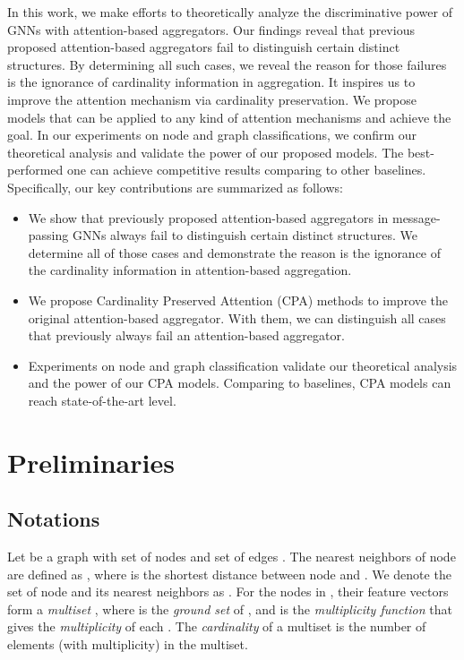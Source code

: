 \documentclass[letterpaper]{article} \usepackage{aaai20}  \usepackage{times}  \usepackage{helvet} \usepackage{courier}  \usepackage[hyphens]{url}  \usepackage{graphicx} \urlstyle{rm} \def\UrlFont{\rm}  \usepackage{graphicx}  \frenchspacing  \setlength{\pdfpagewidth}{8.5in}  \setlength{\pdfpageheight}{11in}
\theoremstyle{plain}
\theoremstyle{definition}
\begin{document}
In this work, we make efforts to theoretically analyze the discriminative power of GNNs with attention-based aggregators. Our findings reveal that previous proposed attention-based aggregators fail to distinguish certain distinct structures. By determining all such cases, we reveal the reason for those failures is the ignorance of cardinality information in aggregation. It inspires us to improve the attention mechanism via cardinality preservation. We propose models that can be applied to any kind of attention mechanisms and achieve the goal. In our experiments on node and graph classifications, we confirm our theoretical analysis and validate the power of our proposed models. The best-performed one can achieve competitive results comparing to other baselines. Specifically, our key contributions are summarized as follows:
\begin{itemize}
\item We show that previously proposed attention-based aggregators in message-passing GNNs always fail to distinguish certain distinct structures. We determine all of those cases and demonstrate the reason is the ignorance of the cardinality information in attention-based aggregation.
\item We propose Cardinality Preserved Attention (CPA) methods to improve the original attention-based aggregator. With them, we can distinguish all cases that previously always fail an attention-based aggregator.
\item Experiments on node and graph classification validate our theoretical analysis and the power of our CPA models. Comparing to baselines, CPA models can reach state-of-the-art level.
\end{itemize}

\section{Preliminaries}

\subsection{Notations}
Let  be a graph with set of nodes  and set of edges . The nearest neighbors of node  are defined as , where  is the shortest distance between node  and . We denote the set of node  and its nearest neighbors as . For the nodes in , their feature vectors form a {\em multiset} , where  is the {\em ground set} of , and  is the {\em multiplicity function} that gives the {\em multiplicity} of each . The {\em cardinality}  of a multiset is the number of elements (with multiplicity) in the multiset.
\end{document}
